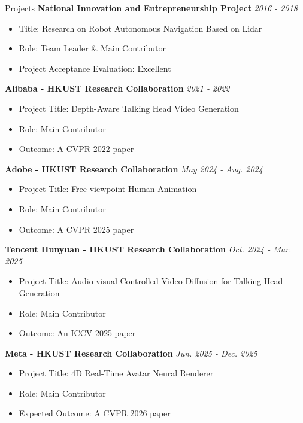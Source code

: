 \documentclass{resume} %
\begin{document}
\begin{rSection}{Projects}
{\bf National Innovation and Entrepreneurship Project} \hfill {\em 2016 - 2018}
\begin{itemize}[leftmargin=18pt]
\setlength{\itemsep}{-5pt}
    \item Title: Research on Robot Autonomous Navigation Based on Lidar
    \item Role: Team Leader \& Main Contributor
    \item Project Acceptance Evaluation: Excellent
\end{itemize}

{\bf Alibaba - HKUST Research Collaboration} \hfill {\em 2021 - 2022}
\begin{itemize}[leftmargin=18pt]
\setlength{\itemsep}{-5pt}
    \item Project Title: Depth-Aware Talking Head Video Generation
    \item Role: Main Contributor
    \item Outcome: A CVPR 2022 paper
\end{itemize}

{\bf Adobe - HKUST Research Collaboration} \hfill {\em May 2024 - Aug. 2024}
\begin{itemize}[leftmargin=18pt]
\setlength{\itemsep}{-5pt}
    \item Project Title: Free-viewpoint Human Animation
    \item Role: Main Contributor
    \item Outcome: A CVPR 2025 paper
\end{itemize}

{\bf Tencent Hunyuan - HKUST Research Collaboration} \hfill {\em Oct. 2024 - Mar. 2025}
\begin{itemize}[leftmargin=18pt]
\setlength{\itemsep}{-5pt}
    \item Project Title: Audio-visual Controlled Video Diffusion for Talking Head Generation
    \item Role: Main Contributor
    \item Outcome: An ICCV 2025 paper
\end{itemize}

{\bf Meta - HKUST Research Collaboration} \hfill {\em Jun. 2025 - Dec. 2025}
\begin{itemize}[leftmargin=18pt]
\setlength{\itemsep}{-5pt}
    \item Project Title: 4D Real-Time Avatar Neural Renderer
    \item Role: Main Contributor
    \item Expected Outcome: A CVPR 2026 paper
\end{itemize}
\end{rSection}
\end{document}
